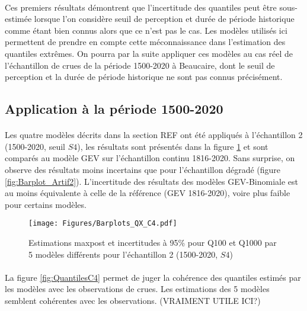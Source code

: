 \documentclass[11pt]{article}
\begin{document}
	\paragraph{} Ces premiers résultats démontrent que l'incertitude des quantiles peut être sous-estimée	lorsque l'on considère seuil de perception et durée de période historique comme étant bien connus alors que ce n'est pas le cas. Les modèles utilisés ici permettent de prendre en compte cette méconnaissance dans l'estimation des quantiles extrêmes. On pourra par la suite appliquer ces modèles au cas réel de l'échantillon de crues de la période 1500-2020 à Beaucaire, dont le seuil de perception et la durée de période historique ne sont pas connus précisément. 
	
	\subsection{Application à la période 1500-2020}

	\paragraph{} Les quatre modèles décrits dans la section REF ont été appliqués à l'échantillon 2 (1500-2020, seuil $S4$), les résultats sont présentés dans la figure \ref{fig:BarplotC4} et sont comparés au modèle GEV sur l'échantillon continu 1816-2020. Sans surprise, on observe des résultats moins incertains que pour l'échantillon dégradé (figure \ref{fig:Barplot_Artif2}). L'incertitude des résultats des modèles GEV-Binomiale est au moins équivalente à celle de la référence (GEV 1816-2020), voire plus faible pour certains modèles. 	
	

	\begin{figure}[h]
		\centering
		\texttt{[image: Figures/Barplots\_QX\_C4.pdf]}
		\caption{Estimations maxpost et incertitudes à 95\% pour Q100 et Q1000 par 5 modèles différents pour l'échantillon 2 (1500-2020, $S4$)}
		\label{fig:BarplotC4}
	\end{figure}
	
	\paragraph{} La figure \ref{fig:QuantilesC4} permet de juger la cohérence des quantiles estimés par les modèles avec les observations de crues. Les estimations des 5 modèles semblent cohérentes avec les observations. (VRAIMENT UTILE ICI?)	
	
\end{document}
